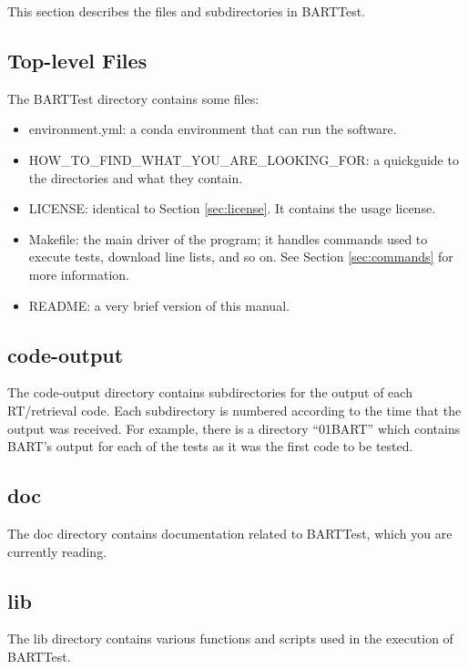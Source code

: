 \documentclass[letterpaper, 12pt]{article}
\begin{document}
This section describes the files and subdirectories in BARTTest.

\subsection{Top-level Files}
The BARTTest directory contains some files:
\begin{itemize} \itemsep0pt
  \item environment.yml: a conda environment that can run the software.
  \item HOW{\_}TO{\_}FIND{\_}WHAT{\_}YOU{\_}ARE{\_}LOOKING{\_}FOR: a quickguide to the directories and what they contain.
  \item LICENSE: identical to Section \ref{sec:license}. It contains the 
        usage license.
  \item Makefile: the main driver of the program; it handles commands used 
        to execute tests, download line lists, and so on. See Section 
        \ref{sec:commands} for more information.
  \item README: a very brief version of this manual.
\end{itemize}

\subsection{code-output}
\label{sec:output}
The code-output directory contains subdirectories for the output of each RT/retrieval code. 
Each subdirectory is numbered according to the time that the output was received. 
For example, there is a directory ``01BART'' which contains BART's output for each of the tests as it was the first code to be tested.

\subsection{doc}
The doc directory contains documentation related to BARTTest, which you are currently reading.

\subsection{lib}
The lib directory contains various functions and scripts used in the execution 
of BARTTest.
\end{document}
